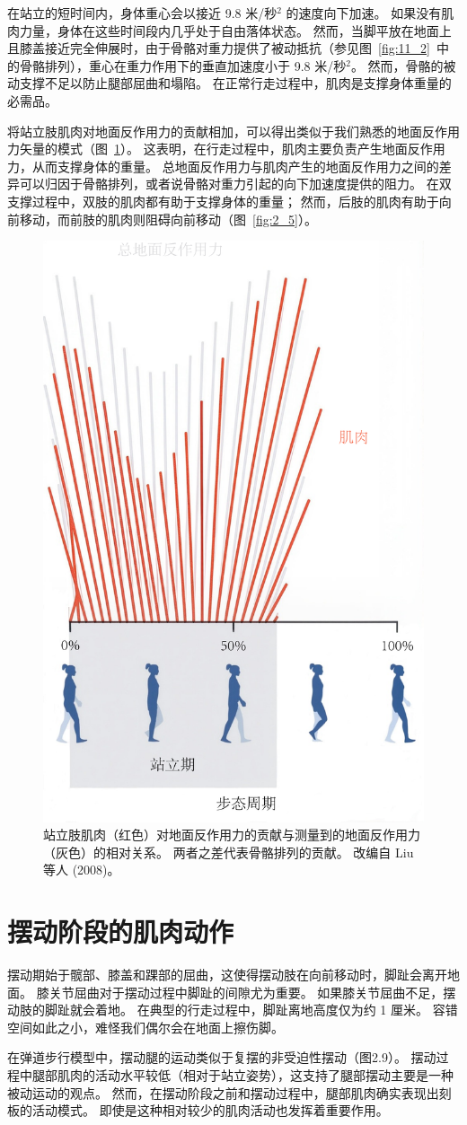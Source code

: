 在站立的短时间内，身体重心会以接近 9.8 米/秒$^2$ 的速度向下加速。
如果没有肌肉力量，身体在这些时间段内几乎处于自由落体状态。
然而，当脚平放在地面上且膝盖接近完全伸展时，由于骨骼对重力提供了被动抵抗（参见图~\ref{fig:11_2}~中的骨骼排列），重心在重力作用下的垂直加速度小于 9.8 米/秒$^2$。
然而，骨骼的被动支撑不足以防止腿部屈曲和塌陷。
在正常行走过程中，肌肉是支撑身体重量的必需品。


将站立肢肌肉对地面反作用力的贡献相加，可以得出类似于我们熟悉的地面反作用力矢量的模式（图~\ref{fig:11_3}）。
这表明，在行走过程中，肌肉主要负责产生地面反作用力，从而支撑身体的重量。
总地面反作用力与肌肉产生的地面反作用力之间的差异可以归因于骨骼排列，或者说骨骼对重力引起的向下加速度提供的阻力。
在双支撑过程中，双肢的肌肉都有助于支撑身体的重量；
然而，后肢的肌肉有助于向前移动，而前肢的肌肉则阻碍向前移动（图~\ref{fig:2_5}）。


\begin{figure}[!htb]
	\centering
	\includegraphics[width=0.4\linewidth]{chap11/11_3}
	\caption{站立肢肌肉（红色）对地面反作用力的贡献与测量到的地面反作用力（灰色）的相对关系。
		两者之差代表骨骼排列的贡献。
		改编自 Liu 等人 (2008)。 \label{fig:11_3}}
\end{figure}


\section{摆动阶段的肌肉动作}

摆动期始于髋部、膝盖和踝部的屈曲，这使得摆动肢在向前移动时，脚趾会离开地面。
膝关节屈曲对于摆动过程中脚趾的间隙尤为重要。
如果膝关节屈曲不足，摆动肢的脚趾就会着地。
在典型的行走过程中，脚趾离地高度仅为约 1 厘米。
容错空间如此之小，难怪我们偶尔会在地面上擦伤脚。


在弹道步行模型中，摆动腿的运动类似于复摆的非受迫性摆动（图2.9）。
摆动过程中腿部肌肉的活动水平较低（相对于站立姿势），这支持了腿部摆动主要是一种被动运动的观点。
然而，在摆动阶段之前和摆动过程中，腿部肌肉确实表现出刻板的活动模式。
即使是这种相对较少的肌肉活动也发挥着重要作用。


